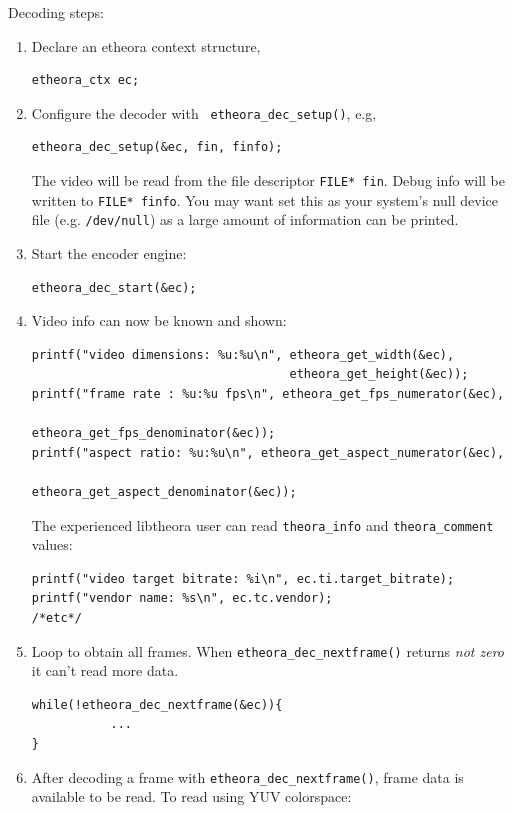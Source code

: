 \documentclass{article}
\begin{document}
Decoding steps: 
\begin{enumerate}
\item Declare an etheora context structure, 

\begin{verbatim}
etheora_ctx ec;
\end{verbatim}

\item Configure the decoder with \texttt{ etheora\_dec\_setup()}, e.g, 
\begin{verbatim}
etheora_dec_setup(&ec, fin, finfo);
\end{verbatim}
The video will be read from the file descriptor 
\texttt{FILE* fin}. Debug info will be written to \texttt{FILE*
finfo}. You may want set this as your system's null device file (e.g.
\texttt{/dev/null}) as a large amount of information  can be printed. 

\item Start the encoder engine: 
\begin{verbatim}
etheora_dec_start(&ec); 
\end{verbatim}

\item Video info can now be known and shown: 

\begin{verbatim}
printf("video dimensions: %u:%u\n", etheora_get_width(&ec), 
                                    etheora_get_height(&ec));
printf("frame rate : %u:%u fps\n", etheora_get_fps_numerator(&ec), 
                                   etheora_get_fps_denominator(&ec));
printf("aspect ratio: %u:%u\n", etheora_get_aspect_numerator(&ec), 
                                etheora_get_aspect_denominator(&ec));
\end{verbatim}

The experienced libtheora user can read \texttt{theora\_info} and
\texttt{theora\_comment} values:
\begin{verbatim}
printf("video target bitrate: %i\n", ec.ti.target_bitrate); 
printf("vendor name: %s\n", ec.tc.vendor); 
/*etc*/
\end{verbatim}

\item Loop to obtain all frames. When \texttt{etheora\_dec\_nextframe()}
returns \textit{not zero} it can't read more data. 
\begin{verbatim}
while(!etheora_dec_nextframe(&ec)){
           ...
}
\end{verbatim}

\item After decoding a frame with \texttt{etheora\_dec\_nextframe()},
frame data is available to be read. To read using YUV colorspace: 


\end{enumerate}
\end{document}
